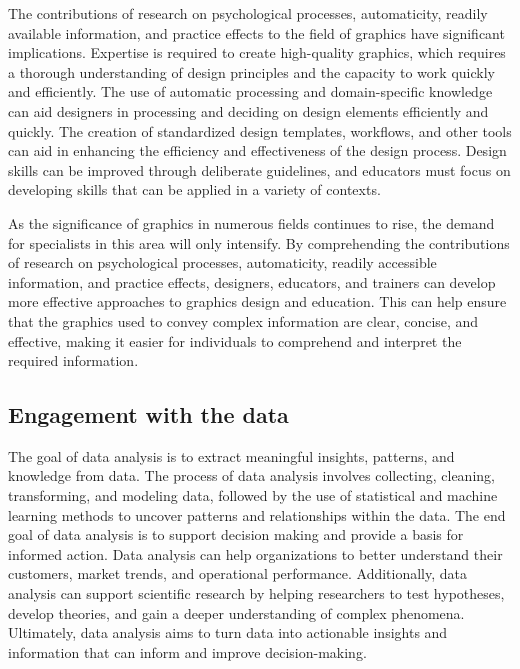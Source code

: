 \documentclass[print]{nuthesis}
\begin{document}
The contributions of research on psychological processes, automaticity, readily available information, and practice effects to the field of graphics have significant implications.
Expertise is required to create high-quality graphics, which requires a thorough understanding of design principles and the capacity to work quickly and efficiently.
The use of automatic processing and domain-specific knowledge can aid designers in processing and deciding on design elements efficiently and quickly.
The creation of standardized design templates, workflows, and other tools can aid in enhancing the efficiency and effectiveness of the design process.
Design skills can be improved through deliberate guidelines, and educators must focus on developing skills that can be applied in a variety of contexts.

As the significance of graphics in numerous fields continues to rise, the demand for specialists in this area will only intensify.
By comprehending the contributions of research on psychological processes, automaticity, readily accessible information, and practice effects, designers, educators, and trainers can develop more effective approaches to graphics design and education.
This can help ensure that the graphics used to convey complex information are clear, concise, and effective, making it easier for individuals to comprehend and interpret the required information.

\hypertarget{engagement-with-the-data}{%
\subsection{Engagement with the data}\label{engagement-with-the-data}}

The goal of data analysis is to extract meaningful insights, patterns, and knowledge from data.
The process of data analysis involves collecting, cleaning, transforming, and modeling data, followed by the use of statistical and machine learning methods to uncover patterns and relationships within the data.
The end goal of data analysis is to support decision making and provide a basis for informed action.
Data analysis can help organizations to better understand their customers, market trends, and operational performance.
Additionally, data analysis can support scientific research by helping researchers to test hypotheses, develop theories, and gain a deeper understanding of complex phenomena.
Ultimately, data analysis aims to turn data into actionable insights and information that can inform and improve decision-making.
\end{document}
